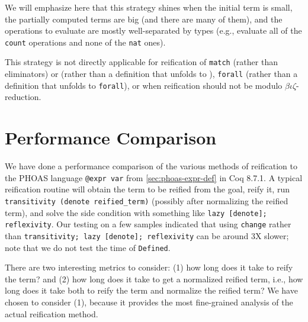We will emphasize here that this strategy shines when the initial term is small, the partially computed terms are big (and there are many of them), and the operations to evaluate are mostly well-separated by types (e.g., evaluate all of the \texttt{count} operations and none of the \texttt{nat} ones).

This strategy is not directly applicable for reification of \texttt{match} (rather than eliminators) or \space (rather than a definition that unfolds to ), \texttt{forall} (rather than a definition that unfolds to \texttt{forall}), or when reification should not be modulo $\beta\iota\zeta$-reduction.

\section{Performance Comparison} \label{sec:perf}
We have done a performance comparison of the various methods of reification to the PHOAS language \texttt{@expr var} from \autoref{sec:phoas-expr-def} in Coq 8.7.1.
A typical reification routine will obtain the term to be reified from the goal, reify it, run \texttt{transitivity (denote reified\_term)} (possibly after normalizing the reified term), and solve the side condition with something like \texttt{lazy [denote]; reflexivity}.
Our testing on a few samples indicated that using \texttt{change} rather than \texttt{transitivity; lazy [denote]; reflexivity} can be around 3X slower; note that we do not test the time of \texttt{Defined}.

There are two interesting metrics to consider:
(1) how long does it take to reify the term?
and (2) how long does it take to get a normalized reified term, i.e., how long does it take both to reify the term and normalize the reified term?
We have chosen to consider (1), because it provides the most fine-grained analysis of the actual reification method.


